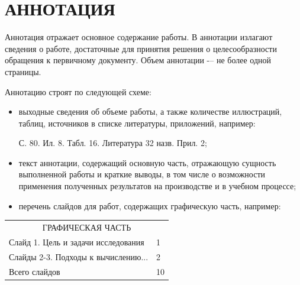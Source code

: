 \newpage
\section*{АННОТАЦИЯ}

Аннотация отражает основное содержание работы. В аннотации излагают сведения о работе, достаточные для принятия решения о целесообразности обращения к первичному документу. Объем аннотации -– не более одной страницы.

Аннотацию строят по следующей схеме:
\begin{itemize}
\item выходные сведения об объеме работы, а также количестве иллюстраций, таблиц, источников в списке литературы, приложений, например:

С. 80. Ил. 8. Табл. 16. Литература 32 назв. Прил. 2;

\item текст аннотации, содержащий основную часть, отражающую сущность выполненной работы и краткие выводы, в том числе о возможности применения полученных результатов на производстве и в учебном процессе;
\item перечень слайдов для работ, содержащих графическую часть, например:
\end{itemize}

\begin{table}[h]

\begin{tabular}{p{14.5cm} p{1cm}}
\multicolumn{2}{c}{ГРАФИЧЕСКАЯ ЧАСТЬ} \\
	Слайд 1. Цель и задачи исследования  & 1 \\
	Слайды 2-3. Подходы к вычислению...  & 2 \\
\hline
	Всего слайдов & 10
\end{tabular}

\end{table} 
